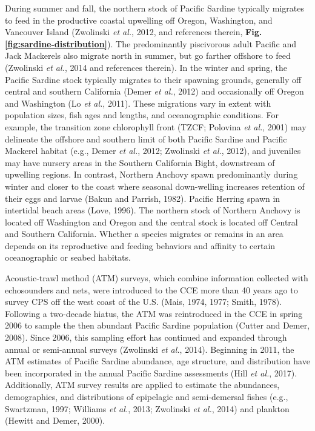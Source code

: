 \documentclass[]{article}
\begin{document}
During summer and fall, the northern stock of Pacific Sardine typically migrates to feed in the productive coastal upwelling off Oregon, Washington, and Vancouver Island (Zwolinski \emph{et al.}, 2012, and references therein, \textbf{Fig. \ref{fig:sardine-distribution}}). The predominantly piscivorous adult Pacific and Jack Mackerels also migrate north in summer, but go farther offshore to feed (Zwolinski \emph{et al.}, 2014 and references therein). In the winter and spring, the Pacific Sardine stock typically migrates to their spawning grounds, generally off central and southern California (Demer \emph{et al.}, 2012) and occasionally off Oregon and Washington (Lo \emph{et al.}, 2011). These migrations vary in extent with population sizes, fish ages and lengths, and oceanographic conditions. For example, the transition zone chlorophyll front (TZCF; Polovina \emph{et al.}, 2001) may delineate the offshore and southern limit of both Pacific Sardine and Pacific Mackerel habitat (e.g., Demer \emph{et al.}, 2012; Zwolinski \emph{et al.}, 2012), and juveniles may have nursery areas in the Southern California Bight, downstream of upwelling regions. In contrast, Northern Anchovy spawn predominantly during winter and closer to the coast where seasonal down-welling increases retention of their eggs and larvae (Bakun and Parrish, 1982). Pacific Herring spawn in intertidal beach areas (Love, 1996). The northern stock of Northern Anchovy is located off Washington and Oregon and the central stock is located off Central and Southern California. Whether a species migrates or remains in an area depends on its reproductive and feeding behaviors and affinity to certain oceanographic or seabed habitats.

Acoustic-trawl method (ATM) surveys, which combine information collected with echosounders and nets, were introduced to the CCE more than 40 years ago to survey CPS off the west coast of the U.S. (Mais, 1974, 1977; Smith, 1978). Following a two-decade hiatus, the ATM was reintroduced in the CCE in spring 2006 to sample the then abundant Pacific Sardine population (Cutter and Demer, 2008). Since 2006, this sampling effort has continued and expanded through annual or semi-annual surveys (Zwolinski \emph{et al.}, 2014). Beginning in 2011, the ATM estimates of Pacific Sardine abundance, age structure, and distribution have been incorporated in the annual Pacific Sardine assessments (Hill \emph{et al.}, 2017). Additionally, ATM survey results are applied to estimate the abundances, demographies, and distributions of epipelagic and semi-demersal fishes (e.g., Swartzman, 1997; Williams \emph{et al.}, 2013; Zwolinski \emph{et al.}, 2014) and plankton (Hewitt and Demer, 2000).
\end{document}
